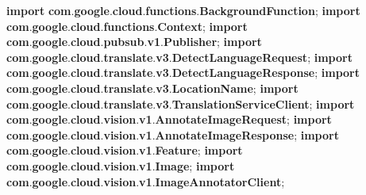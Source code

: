 \documentclass[
]{article}
\newenvironment{Shaded}{}{}
\newcommand{\ImportTok}[1]{\textcolor[rgb]{0.00,0.50,0.00}{\textbf{#1}}}
\newcommand{\KeywordTok}[1]{\textcolor[rgb]{0.00,0.44,0.13}{\textbf{#1}}}
\newcommand{\OperatorTok}[1]{\textcolor[rgb]{0.40,0.40,0.40}{#1}}
\begin{document}
\begin{Shaded}
\begin{Highlighting}[]
\KeywordTok{import} \ImportTok{com}\OperatorTok{.}\ImportTok{google}\OperatorTok{.}\ImportTok{cloud}\OperatorTok{.}\ImportTok{functions}\OperatorTok{.}\ImportTok{BackgroundFunction}\OperatorTok{;}
\KeywordTok{import} \ImportTok{com}\OperatorTok{.}\ImportTok{google}\OperatorTok{.}\ImportTok{cloud}\OperatorTok{.}\ImportTok{functions}\OperatorTok{.}\ImportTok{Context}\OperatorTok{;}
\KeywordTok{import} \ImportTok{com}\OperatorTok{.}\ImportTok{google}\OperatorTok{.}\ImportTok{cloud}\OperatorTok{.}\ImportTok{pubsub}\OperatorTok{.}\ImportTok{v1}\OperatorTok{.}\ImportTok{Publisher}\OperatorTok{;}
\KeywordTok{import} \ImportTok{com}\OperatorTok{.}\ImportTok{google}\OperatorTok{.}\ImportTok{cloud}\OperatorTok{.}\ImportTok{translate}\OperatorTok{.}\ImportTok{v3}\OperatorTok{.}\ImportTok{DetectLanguageRequest}\OperatorTok{;}
\KeywordTok{import} \ImportTok{com}\OperatorTok{.}\ImportTok{google}\OperatorTok{.}\ImportTok{cloud}\OperatorTok{.}\ImportTok{translate}\OperatorTok{.}\ImportTok{v3}\OperatorTok{.}\ImportTok{DetectLanguageResponse}\OperatorTok{;}
\KeywordTok{import} \ImportTok{com}\OperatorTok{.}\ImportTok{google}\OperatorTok{.}\ImportTok{cloud}\OperatorTok{.}\ImportTok{translate}\OperatorTok{.}\ImportTok{v3}\OperatorTok{.}\ImportTok{LocationName}\OperatorTok{;}
\KeywordTok{import} \ImportTok{com}\OperatorTok{.}\ImportTok{google}\OperatorTok{.}\ImportTok{cloud}\OperatorTok{.}\ImportTok{translate}\OperatorTok{.}\ImportTok{v3}\OperatorTok{.}\ImportTok{TranslationServiceClient}\OperatorTok{;}
\KeywordTok{import} \ImportTok{com}\OperatorTok{.}\ImportTok{google}\OperatorTok{.}\ImportTok{cloud}\OperatorTok{.}\ImportTok{vision}\OperatorTok{.}\ImportTok{v1}\OperatorTok{.}\ImportTok{AnnotateImageRequest}\OperatorTok{;}
\KeywordTok{import} \ImportTok{com}\OperatorTok{.}\ImportTok{google}\OperatorTok{.}\ImportTok{cloud}\OperatorTok{.}\ImportTok{vision}\OperatorTok{.}\ImportTok{v1}\OperatorTok{.}\ImportTok{AnnotateImageResponse}\OperatorTok{;}
\KeywordTok{import} \ImportTok{com}\OperatorTok{.}\ImportTok{google}\OperatorTok{.}\ImportTok{cloud}\OperatorTok{.}\ImportTok{vision}\OperatorTok{.}\ImportTok{v1}\OperatorTok{.}\ImportTok{Feature}\OperatorTok{;}
\KeywordTok{import} \ImportTok{com}\OperatorTok{.}\ImportTok{google}\OperatorTok{.}\ImportTok{cloud}\OperatorTok{.}\ImportTok{vision}\OperatorTok{.}\ImportTok{v1}\OperatorTok{.}\ImportTok{Image}\OperatorTok{;}
\KeywordTok{import} \ImportTok{com}\OperatorTok{.}\ImportTok{google}\OperatorTok{.}\ImportTok{cloud}\OperatorTok{.}\ImportTok{vision}\OperatorTok{.}\ImportTok{v1}\OperatorTok{.}\ImportTok{ImageAnnotatorClient}\OperatorTok{;}

\end{Highlighting}
\end{Shaded}
\end{document}
